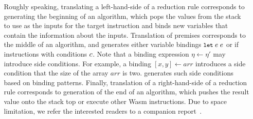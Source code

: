 Roughly speaking, translating a left-hand-side of a reduction rule corresponds to
generating the beginning of an algorithm, which pops the values from the stack
to use as the inputs for the target instruction and binds new variables
that contain the information about the inputs.
Translation of premises corresponds to the middle of an algorithm,
and generates either variable bindings $\texttt{\small let} \; e \; e$
or if instructions with conditions $c$.
Note that a binding expression $\eta \leftarrow \eta'$ may introduce side conditions.
For example, a binding $[x, y] \leftarrow \mathit{arr}$ introduces a side condition
that the size of the array $\mathit{arr}$ is two.
\dltoil generates such side conditions based on binding patterns.
Finally, translation of a right-hand-side of a reduction rule corresponds to
generation of the end of an algorithm, which pushes the result value onto the stack top
or execute other Wasm instructions.
Due to space limitation, we refer the interested readers to a companion report~\cite{il-tr}.
